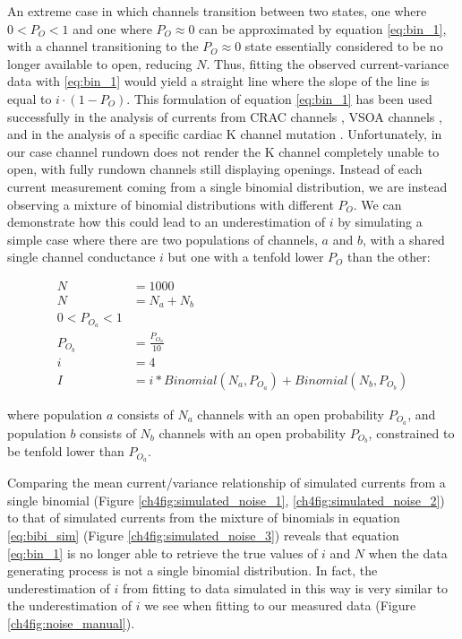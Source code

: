 An extreme case in which channels transition between two states, one where $0 < P_O < 1$ and one where $P_O \approx 0$ can be approximated by equation \ref{eq:bin_1}, with a channel transitioning to the $P_O \approx 0$ state essentially considered to be no longer available to open, reducing $N$.
Thus, fitting the observed current-variance data with \ref{eq:bin_1} would yield a straight line where the slope of the line is equal to $i \cdot (1 - P_O)$.
This formulation of equation \ref{eq:bin_1} has been used successfully in the analysis of currents from CRAC channels \cite{prakriya_regulation_2006}, VSOA channels \cite{jackson_single-channel_1995, jackson_single_1996}, and in the analysis of a specific cardiac K\ATP{} channel mutation \cite{tammaro_mutation_2007}.
Unfortunately, in our case channel rundown does not render the K\ATP{} channel completely unable to open, with fully rundown channels still displaying openings.
Instead of each current measurement coming from a single binomial distribution, we are instead observing a mixture of binomial distributions with different $P_O$.
We can demonstrate how this could lead to an underestimation of $i$ by simulating a simple case where there are two populations of channels, $a$ and $b$, with a shared single channel conductance $i$ but one with a tenfold lower $P_O$ than the other:

\begin{equation}\label{eq:bibi_sim}
\begin{split}
	N &= 1000 \\
	N &= N_a + N_b \\
	0 < P_{O_{a}} < 1 \\
	P_{O_{b}} &= \frac{P_{O_{a}}}{10} \\
	i &= 4 \\
	I &= i * Binomial(N_a, P_{O_{a}}) + Binomial(N_b, P_{O_{b}})
\end{split}
\end{equation}

where population $a$ consists of $N_a$ channels with an open probability $P_{O_{a}}$, and population $b$ consists of $N_b$ channels with an open probability $P_{O_{b}}$, constrained to be tenfold lower than $P_{O_{a}}$.

Comparing the mean current/variance relationship of simulated currents from a single binomial (Figure \ref{ch4fig:simulated_noise_1}, \ref{ch4fig:simulated_noise_2}) to that of simulated currents from the mixture of binomials in equation \ref{eq:bibi_sim} (Figure \ref{ch4fig:simulated_noise_3}) reveals that equation \ref{eq:bin_1} is no longer able to retrieve the true values of $i$ and $N$ when the data generating process is not a single binomial distribution.
In fact, the underestimation of $i$ from fitting to data simulated in this way is very similar to the underestimation of $i$ we see when fitting to our measured data (Figure \ref{ch4fig:noise_manual}).


